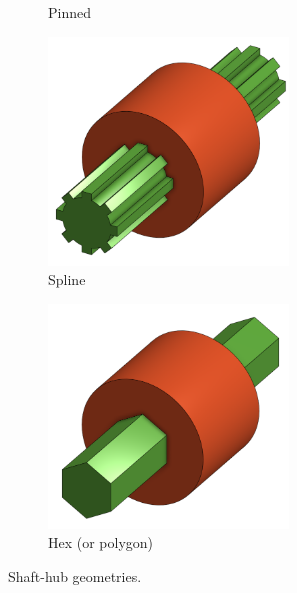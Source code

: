 \documentclass[10pt,letterpaper]{book}
\begin{document}
\begin{figure}[H]
\begin{subfigure}[b]{.32\linewidth}
			\caption{Pinned}
		\end{subfigure}
		\begin{subfigure}[b]{.32\linewidth}
			\includegraphics[width=0.7\textwidth]{imgs/splineshaft.png}
			\caption{Spline}
		\end{subfigure}
		\begin{subfigure}[b]{.32\linewidth}
			\includegraphics[width=0.7\textwidth]{imgs/hexshaft.png}
			\caption{Hex (or polygon)}
		\end{subfigure}
		
		\caption{Shaft-hub geometries.}
	\end{figure}
	
\end{document}

